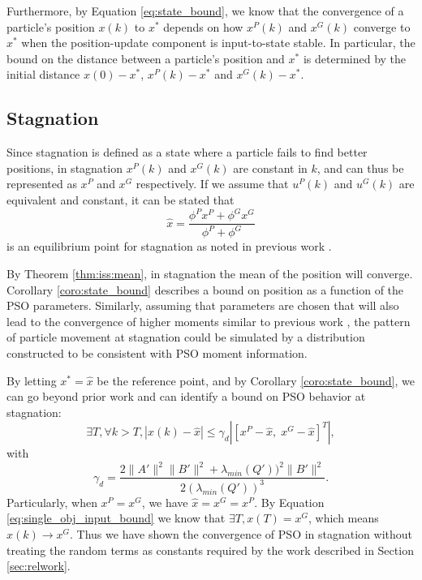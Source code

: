 \documentclass{sig-alternate}
\begin{document}
Furthermore, by Equation \eqref{eq:state_bound}, we know that the convergence of a particle's position $ x(k) $ to $ x^{*} $ depends on how $ x^{P}(k) $ and $ x^{G}(k) $ converge to $ x^{*} $ when the position-update component is input-to-state stable.
In particular, the bound on the distance between a particle's position and  $ x^{*} $ is determined by the initial distance $ x(0) -  x^{*} $, $ x^{P}(k) -  x^{*} $ and $ x^{G}(k) -  x^{*} $.

\subsection{Stagnation}

Since stagnation is defined as a state where a particle fails to find better positions, in stagnation $ x^{P}(k) $ and $ x^{G}(k) $ are constant in $ k $, and can thus be represented as $ x^{P} $ and $ x^{G} $ respectively.
If we assume that $ u^{P}(k) $ and $ u^{G}(k) $ are equivalent and constant, it can be stated that
\begin{equation}
\label{eq:single_obj_equilibrium}
\hat{x} = \frac{\phi^{P} x^{P} + \phi^{G} x^{G} }{ \phi^{P} + \phi^{G} } 
\end{equation}
is an equilibrium point for stagnation as noted in previous work \cite{985692}.

By Theorem \ref{thm:iss:mean}, in stagnation the mean of the position will converge.
Corollary \ref{coro:state_bound} describes a bound on position as a function of the PSO parameters.
Similarly, assuming that parameters are chosen that will also lead to the convergence of higher moments similar to previous work \cite{Jiang20078, Poli:2007:EAS:1276958.1276977}, the pattern of particle movement at stagnation could be simulated by a distribution constructed to be consistent with PSO moment information\cite{Poli:2007:EAS:1276958.1276977}.

By letting $ x^{*} = \hat{x} $ be the reference point, and
by Corollary \ref{coro:state_bound}, we can go beyond prior work and can identify a bound on PSO behavior at stagnation:
\begin{equation}
\label{eq:single_obj_input_bound}
\exists T, \forall k > T, 
| x(k) - \hat{x} | \leq  \gamma_{d} | [ x^{P} - \hat{x},\; x^{G} - \hat{x} ]^{T} |,
\end{equation}
with 
\begin{equation}
\gamma_{d} = \frac{ 2 \lVert A' \rVert^{2} \lVert B' \rVert^{2} + \lambda_{min}(Q') )^{2} \lVert B' \rVert^{2} }{ 2( \lambda_{min}(Q') )^{3} }.
\end{equation}
Particularly, when $ x^{P} = x^{G} $, we have
$ \hat{x} = x^{G} = x^{P} $.
By Equation \eqref{eq:single_obj_input_bound} we know that
$ \exists T , x(T) = x^{G} $, 
which means $ x(k) \rightarrow x^{G} $.
Thus we have shown the convergence of PSO in stagnation without treating the random terms as constants required by the work described in Section \ref{sec:relwork}.
\end{document}
